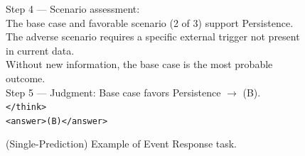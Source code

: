 \begin{figure}[h]
\begin{minipage}{0.95\textwidth}
{{Step 4 --- Scenario assessment: \\
The base case and favorable scenario (2 of 3) support Persistence. \\
The adverse scenario requires a specific external trigger not present in current data. \\
Without new information, the base case is the most probable outcome. \\[6pt]
Step 5 --- Judgment: Base case favors Persistence $\rightarrow$ (B). \\[4pt]
\texttt{</think>} \\
\texttt{<answer>(B)</answer>}
}}
\end{minipage}
\caption{(Single-Prediction) Example of Event Response task.}
\vspace{-40pt}
\end{figure}


